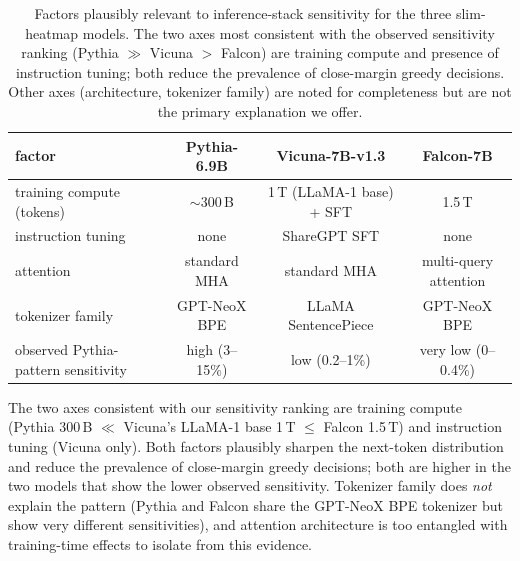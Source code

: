 \begin{table}[htbp]
\centering
\small
\caption{Factors plausibly relevant to inference-stack sensitivity for
  the three slim-heatmap models.
The two axes most consistent with the observed sensitivity ranking
  (Pythia $\gg$ Vicuna $>$ Falcon) are training compute and presence
  of instruction tuning; both reduce the prevalence of close-margin
  greedy decisions.
Other axes (architecture, tokenizer family) are noted for
  completeness but are not the primary explanation we offer.}
\label{tab:helm-pythia-factors-v2}
\begin{tabular}{lccc}
\toprule
factor & Pythia-6.9B & Vicuna-7B-v1.3 & Falcon-7B \\
\midrule
training compute (tokens) & $\sim$300\,B & 1\,T (LLaMA-1 base) + SFT & 1.5\,T \\
instruction tuning        & none         & ShareGPT SFT             & none   \\
attention                 & standard MHA & standard MHA             & multi-query attention \\
tokenizer family          & GPT-NeoX BPE & LLaMA SentencePiece      & GPT-NeoX BPE \\
observed Pythia-pattern sensitivity & high (3--15\%) & low (0.2--1\%) & very low (0--0.4\%) \\
\bottomrule
\end{tabular}
\end{table}

The two axes consistent with our sensitivity ranking are training
  compute (Pythia 300\,B $\ll$ Vicuna's LLaMA-1 base 1\,T $\le$ Falcon
  1.5\,T) and instruction tuning (Vicuna only).
Both factors plausibly sharpen the next-token distribution and reduce
  the prevalence of close-margin greedy decisions; both are higher in
  the two models that show the lower observed sensitivity.
Tokenizer family does \emph{not} explain the pattern (Pythia and
  Falcon share the GPT-NeoX BPE tokenizer but show very different
  sensitivities), and attention architecture is too entangled with
  training-time effects to isolate from this evidence.

